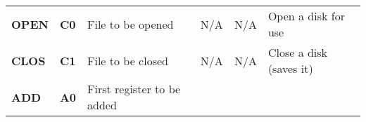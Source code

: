 \documentclass[]{article}
\begin{document}
\begin{longtable}[c]{@{}llllll@{}}
\begin{minipage}[t]{0.14\columnwidth}\raggedright\strut
\textbf{OPEN}
\strut\end{minipage} &
\begin{minipage}[t]{0.14\columnwidth}\raggedright\strut
\textbf{C0}
\strut\end{minipage} &
\begin{minipage}[t]{0.14\columnwidth}\raggedright\strut
File to be opened
\strut\end{minipage} &
\begin{minipage}[t]{0.14\columnwidth}\raggedright\strut
N/A
\strut\end{minipage} &
\begin{minipage}[t]{0.14\columnwidth}\raggedright\strut
N/A
\strut\end{minipage} &
\begin{minipage}[t]{0.14\columnwidth}\raggedright\strut
Open a disk for use
\strut\end{minipage}\tabularnewline
\begin{minipage}[t]{0.14\columnwidth}\raggedright\strut
\textbf{CLOS}
\strut\end{minipage} &
\begin{minipage}[t]{0.14\columnwidth}\raggedright\strut
\textbf{C1}
\strut\end{minipage} &
\begin{minipage}[t]{0.14\columnwidth}\raggedright\strut
File to be closed
\strut\end{minipage} &
\begin{minipage}[t]{0.14\columnwidth}\raggedright\strut
N/A
\strut\end{minipage} &
\begin{minipage}[t]{0.14\columnwidth}\raggedright\strut
N/A
\strut\end{minipage} &
\begin{minipage}[t]{0.14\columnwidth}\raggedright\strut
Close a disk (saves it)
\strut\end{minipage}\tabularnewline
\begin{minipage}[t]{0.14\columnwidth}\raggedright\strut
\textbf{ADD}
\strut\end{minipage} &
\begin{minipage}[t]{0.14\columnwidth}\raggedright\strut
\textbf{A0}
\strut\end{minipage} &
\begin{minipage}[t]{0.14\columnwidth}\raggedright\strut
First register to be added
\strut\end{minipage} &

\end{longtable}
\end{document}
